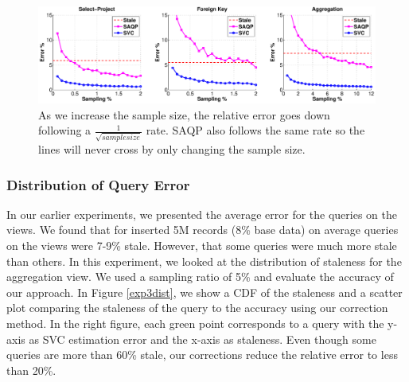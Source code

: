 \begin{figure}[ht!]
\hspace{-2em}
 \includegraphics[scale=0.21]{exp/exp1-samplesize-accuracy.eps}
 \caption{As we increase the sample size, the relative error goes down following a $\frac{1}{\sqrt{samplesize}}$ rate. SAQP also follows the same rate so the lines will never cross by only changing the sample size. \label{exp1sample} }
\end{figure}

\subsubsection{Distribution of Query Error} In our earlier experiments, we presented the average error for the queries on the views.
We found that for inserted 5M records (8\% base data) on average queries on the views were 7-9\% stale. 
However, that some queries were much more stale than others.
In this experiment, we looked at the distribution of staleness for the aggregation view.
We used a sampling ratio of 5\% and evaluate the accuracy of our approach. 
In Figure \ref{exp3dist}, we show a CDF of the staleness and a scatter plot comparing the staleness of the query to the accuracy using our correction method.
In the right figure, each green point corresponds to a query with the y-axis as SVC estimation error and the x-axis as staleness. 
Even though some queries are more than 60\% stale, our corrections reduce the relative error to less than 20\%.

